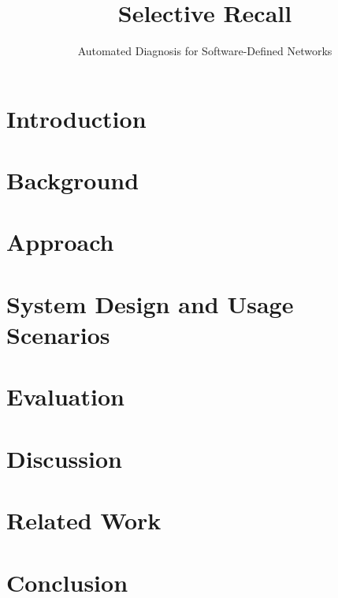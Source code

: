 \documentclass{sig-alternate-10pt}
\begin{document}
    \date{}

\title{Selective Recall}
\subtitle{Automated Diagnosis for Software-Defined Networks}
    \maketitle
   \thispagestyle{empty}

\abstract{{\it }}

\section{Introduction}
\label{sec:intro}


\section{Background}
\label{sec:overview}


\section{Approach}
\label{sec:approach}


\section{System Design and Usage Scenarios}
\label{sec:architecture}


\section{Evaluation}
\label{sec:evaluation}


\section{Discussion}
\label{sec:discussion}


\section{Related Work}
\label{sec:related_work}


\section{Conclusion}
\label{sec:conclusion}



 

%

\end{document}
